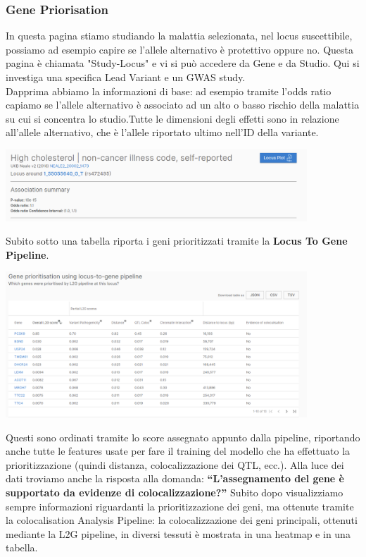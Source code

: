 \documentclass{article}
\begin{document}
\subsubsection{Gene Priorisation}
In questa pagina stiamo studiando la malattia selezionata, nel locus suscettibile, possiamo ad esempio capire se l'allele alternativo è protettivo oppure no.
Questa pagina è chiamata "Study-Locus" e vi si può accedere da Gene e da Studio. Qui si investiga una specifica Lead Variant e un GWAS study.\\
Dapprima abbiamo la informazioni di base: ad esempio tramite l'odds ratio capiamo se l'allele alternativo è associato ad un alto o basso rischio della malattia su cui si concentra lo studio.Tutte le dimensioni degli effetti sono in relazione all'allele alternativo, che è l'allele riportato ultimo nell'ID della variante.
\begin{center}
    \includegraphics[width=0.85\textwidth]{figures/StudyLocus.png}
\end{center}
Subito sotto una tabella riporta i geni prioritizzati tramite la \textbf{Locus To Gene Pipeline}.
\begin{center}
    \includegraphics[width=0.85\textwidth]{figures/StudyLocus2.png}
\end{center}
Questi sono ordinati tramite lo score assegnato appunto dalla pipeline, riportando anche tutte le features usate per fare il training del modello che ha effettuato la prioritizzazione (quindi distanza, colocalizzazione dei QTL, ecc.). Alla luce dei dati troviamo anche la risposta alla domanda: \textbf{“L'assegnamento del gene è supportato da evidenze di colocalizzazione?”}
Subito dopo visualizziamo sempre informazioni riguardanti la prioritizzazione dei geni, ma ottenute tramite la colocalisation Analysis Pipeline: la colocalizzazione dei geni principali, ottenuti mediante la L2G pipeline, in diversi tessuti è mostrata in una heatmap e in una tabella.
\end{document}
